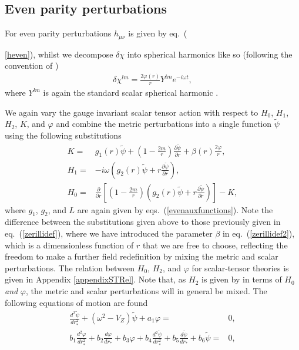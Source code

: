 \documentclass[10pt,twocolumn,preprintnumbers,amsmath,amssymb,nofootinbib
,superscriptaddress]{revtex4-1}
\begin{document}
\subsection{Even parity perturbations}\label{STeven}
For even parity perturbations $h_{\mu\nu}$ is given by eq.~({\ref{heven}), whilst we decompose $\delta\chi$ into spherical harmonics like so (following the convention of \cite{PhysRevD.34.333})
\begin{align}
\delta\chi^{lm}=\frac{2\varphi(r)}{r}Y^{lm}e^{-i\omega t},
\end{align}
where $Y^{lm}$ is again the standard scalar spherical harmonic \cite{Martel:2005ir,Ripley:2017kqg}.

We again vary the gauge invariant scalar tensor action with respect to $H_0$, $H_1$, $H_2$, $K$, and $\varphi$ and combine the metric perturbations into a single function $\tilde{\psi}$ using the following substitutions
\begin{align}
K=&g_1(r)\tilde{\psi}+\left(1-\frac{2m}{r}\right)\frac{\partial \tilde{\psi}}{\partial r}+\beta(r)\frac{2\varphi}{r},\nonumber\\
H_1=&-i\omega \left(g_2(r)\tilde{\psi}+r\frac{\partial \tilde{\psi}}{\partial r}\right),\nonumber\\
H_0=&\frac{\partial}{\partial r}\left[\left(1-\frac{2m}{r}\right)\left(g_2(r)\tilde{\psi}+r\frac{\partial \tilde{\psi}}{\partial r}\right)\right]-K,\label{zerillidef2}
\end{align}
where $g_1$, $g_2$, and $L$ are again given by eqs.~(\ref{evenauxfunctions}). Note the difference between the substitutions given above to those previously given in eq.~(\ref{zerillidef}), where we have introduced the parameter $\beta$ in eq.~(\ref{zerillidef2}), which is a dimensionless function of $r$ that we are free to choose, reflecting the freedom to make a further field redefinition by mixing the metric and scalar perturbations. The relation between $H_0$, $H_2$, and $\varphi$ for scalar-tensor theories is given in Appendix \ref{appendixSTRel}. Note that, as $H_2$ is given by in terms of $H_0$ \textit{and} $\varphi$, the metric and scalar perturbations will in general be mixed. The following equations of motion are found
\begin{align}
\frac{d^2\tilde{\psi}}{dr_\ast^2}+\left(\omega^2-V_Z\right)\tilde{\psi}+a_1\varphi=&0,\label{STeq1}\\
b_1\frac{d^2\varphi}{dr_\ast^2}+b_2\frac{d\varphi}{dr_\ast}+b_3\varphi+b_4\frac{d^2\tilde{\psi}}{dr_\ast^2}+b_5\frac{d\tilde{\psi}}{dr_\ast}+b_6\tilde{\psi}=&0\label{STeq2},

\end{align}}
\end{document}
